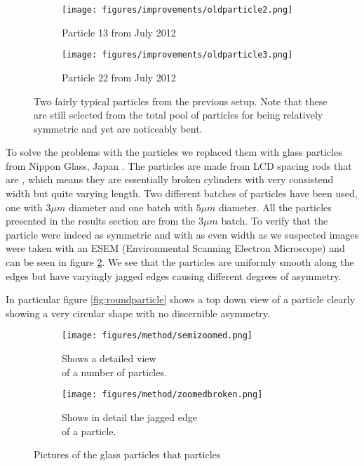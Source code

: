 
\begin{figure}[H]
\centering
\begin{subfigure}[b]{0.45\textwidth}
\texttt{[image: figures/improvements/oldparticle2.png]}
\caption{Particle 13 from July 2012}
\end{subfigure}
\begin{subfigure}[b]{0.45\textwidth}
\texttt{[image: figures/improvements/oldparticle3.png]}
\caption{Particle 22 from July 2012}
\end{subfigure}
\caption{Two fairly typical particles from the previous setup. Note that these are still selected from the total pool of particles for being relatively symmetric and yet are noticeably bent.}
\label{fig:oldparticles}
\end{figure}



To solve the problems with the particles we replaced them with glass particles from Nippon Glass, Japan \cite{Particles}. The particles are made from LCD spacing rods that are , which means they are essentially broken cylinders with very consistend width but quite varying length. Two different batches of particles have been used, one with $3\mu m$ diameter and one batch with $5 \mu m$ diameter. All the particles presented in the results section are from the $3 \mu m$ batch. To verify that the particle were indeed as symmetric and with as even width as we suspected images were taken with an ESEM (Environmental Scanning Electron Microscope) and can be seen in figure \ref{fig:particlepictures}. We see that the particles are uniformly smooth along the edges but have varyingly jagged edges causing different degrees of asymmetry. 

In particular figure \ref{fig:roundparticle} shows a top down view of a particle clearly showing a very circular shape with no discernible asymmetry.

\begin{figure}[H]
\centering
\begin{subfigure}[3a]{0.40\textwidth}
\texttt{[image: figures/method/semizoomed.png]}
\caption{Shows a detailed view \\ of a number of particles.}
\end{subfigure}\hspace{1em}%
\begin{subfigure}[3b]{0.40\textwidth}
\texttt{[image: figures/method/zoomedbroken.png]}
\caption{Shows in detail the jagged edge \\ of a particle.}
\end{subfigure}
\caption{Pictures of the glass particles that particles}
\label{fig:particlepictures}
\end{figure}
 

